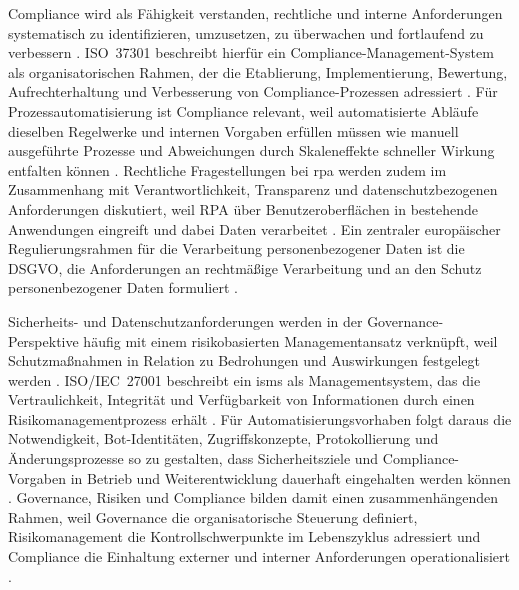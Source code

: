 Compliance wird als Fähigkeit verstanden, rechtliche und interne Anforderungen systematisch zu identifizieren, umzusetzen, zu überwachen und fortlaufend zu verbessern \cite{ISO37301}. 
ISO~37301 beschreibt hierfür ein Compliance-Management-System als organisatorischen Rahmen, der die Etablierung, Implementierung, Bewertung, Aufrechterhaltung und Verbesserung von Compliance-Prozessen adressiert \cite{ISO37301}. 
Für Prozessautomatisierung ist Compliance relevant, weil automatisierte Abläufe dieselben Regelwerke und internen Vorgaben erfüllen müssen wie manuell ausgeführte Prozesse und Abweichungen durch Skaleneffekte schneller Wirkung entfalten können \cite{COSO2025RPAICIF}. 
Rechtliche Fragestellungen bei \gls{rpa} werden zudem im Zusammenhang mit Verantwortlichkeit, Transparenz und datenschutzbezogenen Anforderungen diskutiert, weil RPA über Benutzeroberflächen in bestehende Anwendungen eingreift und dabei Daten verarbeitet \cite{Alpers2019LegalChallengesRPA}. 
Ein zentraler europäischer Regulierungsrahmen für die Verarbeitung personenbezogener Daten ist die DSGVO, die Anforderungen an rechtmäßige Verarbeitung und an den Schutz personenbezogener Daten formuliert \cite{GDPR_EURLex}. 

Sicherheits- und Datenschutzanforderungen werden in der Governance-Perspektive häufig mit einem risikobasierten Managementansatz verknüpft, weil Schutzmaßnahmen in Relation zu Bedrohungen und Auswirkungen festgelegt werden \cite{ISO27001}. 
ISO/IEC~27001 beschreibt ein \gls{isms} als Managementsystem, das die Vertraulichkeit, Integrität und Verfügbarkeit von Informationen durch einen Risikomanagementprozess erhält \cite{ISO27001}. 
Für Automatisierungsvorhaben folgt daraus die Notwendigkeit, Bot-Identitäten, Zugriffskonzepte, Protokollierung und Änderungsprozesse so zu gestalten, dass Sicherheitsziele und Compliance-Vorgaben in Betrieb und Weiterentwicklung dauerhaft eingehalten werden können \cite{ISO27001,COSO2025RPAICIF}. 
Governance, Risiken und Compliance bilden damit einen zusammenhängenden Rahmen, weil Governance die organisatorische Steuerung definiert, Risikomanagement die Kontrollschwerpunkte im Lebenszyklus adressiert und Compliance die Einhaltung externer und interner Anforderungen operationalisiert \cite{Kedziora2021GovernanceModelsRPA,ISO37301,COSO2025RPAICIF}. 


